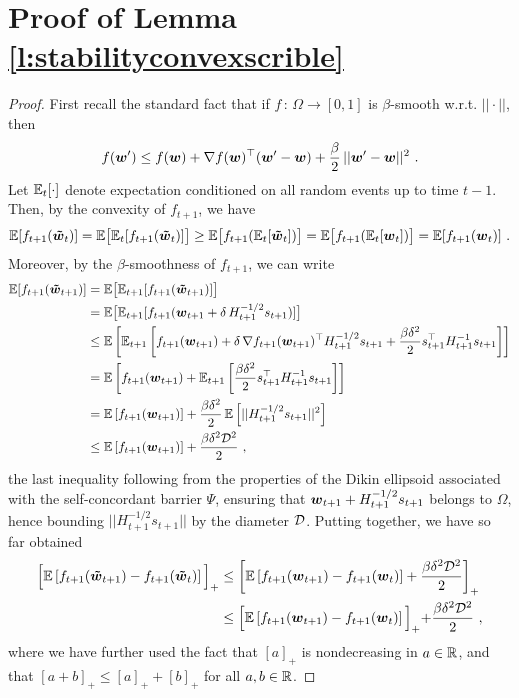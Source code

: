 \section{Proof of Lemma \ref{l:stabilityconvexscrible}}

\begin{proof}
First recall the standard fact that if $f\,:\,\Omega \rightarrow [0,1]$ is $\beta$-smooth w.r.t. $||\cdot||$, then
\[
f(\boldsymbol{w}') \leq f(\boldsymbol{w}) + \nabla f(\boldsymbol{w})^\top(\boldsymbol{w}'-\boldsymbol{w}) + \frac{\beta}{2}\,||\boldsymbol{w}'-\boldsymbol{w}||^2~.
\]
Let $\mathbb{E}_t[\cdot]$ denote expectation conditioned on all random events up to time $t-1$. Then, by the convexity of $f_{t+1}$, we have
%
\begin{align*}
\mathbb{E}[f_{t+1}(\boldsymbol{{\tilde w}}_{t})]
= \mathbb{E}\big[\mathbb{E}_{t}[f_{t+1}(\boldsymbol{{\tilde w}}_{t})]\big]
\geq \mathbb{E}\big[f_{t+1}(\mathbb{E}_{t}[\boldsymbol{{\tilde w}}_{t}])\big]
= \mathbb{E}\big[f_{t+1}(\mathbb{E}_{t}[\boldsymbol{w}_{t}])\big]
= \mathbb{E}[f_{t+1}(\boldsymbol{w}_{t})]~.
\end{align*}
%
Moreover, by the $\beta$-smoothness of $f_{t+1}$, we can write
%
\begin{align*}
\mathbb{E}[f_{t+1}(\boldsymbol{{\tilde w}}_{t+1})]
&= \mathbb{E}\big[\mathbb{E}_{t+1}[f_{t+1}(\boldsymbol{{\tilde w}}_{t+1})]\big]\\
&= \mathbb{E}\big[\mathbb{E}_{t+1}[f_{t+1}(\boldsymbol{w}_{t+1} + \delta\,H_{t+1}^{-1/2}s_{t+1})]\big]\\
&\leq \mathbb{E}\left[\mathbb{E}_{t+1}\left[f_{t+1}(\boldsymbol{w}_{t+1}) + \delta\,\nabla f_{t+1}(\boldsymbol{w}_{t+1})^\top H_{t+1}^{-1/2}s_{t+1}  + \frac{\beta\delta^2}{2}s_{t+1}^\top H_{t+1}^{-1}s_{t+1}\right]\right]\\
&= \mathbb{E}\left[f_{t+1}(\boldsymbol{w}_{t+1}) + \mathbb{E}_{t+1}\left[\frac{\beta\delta^2}{2}s_{t+1}^\top H_{t+1}^{-1}s_{t+1}\right]\right]\\
&= \mathbb{E}\left[f_{t+1}(\boldsymbol{w}_{t+1})\right] + \frac{\beta\delta^2}{2}\,\mathbb{E}\left[||H_{t+1}^{-1/2}s_{t+1}||^2\right]\\
&\leq \mathbb{E}\left[f_{t+1}(\boldsymbol{w}_{t+1})\right] + \frac{\beta\delta^2\mathcal{D}^2}{2}~,
\end{align*}
%
the last inequality following from the properties of the Dikin ellipsoid associated with the self-concordant barrier $\Psi$, ensuring that $\boldsymbol{w}_{t+1} + H_{t+1}^{-1/2}s_{t+1}$ belongs to $\Omega$, hence bounding $||H_{t+1}^{-1/2}s_{t+1}||$ by the diameter $\mathcal{D}$.
%
Putting together, we have so far obtained
%
\begin{align}\label{e:1}
\Bigl[\mathbb{E}\left[f_{t+1}(\boldsymbol{{\tilde w}}_{t+1}) - f_{t+1}(\boldsymbol{{\tilde w}}_{t})\right]\Bigl]_+
&\leq
\left[\mathbb{E}\left[f_{t+1}(\boldsymbol{w}_{t+1}) - f_{t+1}(\boldsymbol{w}_{t})\right]  + \frac{\beta\delta^2\mathcal{D}^2}{2}\right]_+ \notag\\
&\leq
\Bigl[\mathbb{E}\left[f_{t+1}(\boldsymbol{w}_{t+1}) - f_{t+1}(\boldsymbol{w}_{t})\right]\Bigl]_+ + \frac{\beta\delta^2\mathcal{D}^2}{2}~,
\end{align}
%
where we have further used the fact that $[a]_+$ is nondecreasing in $a \in \mathbb{R}$, and that $[a+b]_+ \leq [a]_+ + [b]_+$ for all $a,b \in \mathbb{R}$.


\end{proof}
